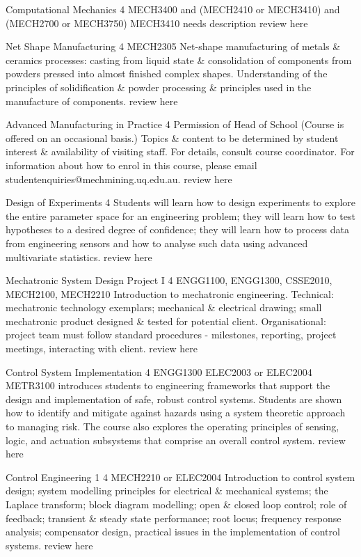 	{Computational Mechanics}
	{4}
	{MECH3400 and (MECH2410 or MECH3410) and (MECH2700 or MECH3750)}
	{}
	{MECH3410}
	{needs description}
	{review here}

	{Net Shape Manufacturing}
	{4}
	{MECH2305}
	{}
	{}
	{Net-shape manufacturing of metals \& ceramics processes: casting from liquid state \& consolidation of components from powders pressed into almost finished complex shapes. Understanding of the principles of solidification \& powder processing \& principles used in the manufacture of components.}
	{review here}

	{Advanced Manufacturing in Practice}
	{4}
	{Permission of Head of School}
	{}
	{}
	{(Course is offered on an occasional basis.) Topics \& content to be determined by student interest \& availability of visiting staff. For details, consult course coordinator. For information about how to enrol in this course, please email studentenquiries@mechmining.uq.edu.au.}
	{review here}

	{Design of Experiments}
	{4}
	{}
	{}
	{}
	{Students will learn how to design experiments to explore the entire parameter space for an engineering problem; they will learn how to test hypotheses to a desired degree of confidence; they will learn how to process data from engineering sensors and how to analyse such data using advanced multivariate statistics.}
	{review here}

	{Mechatronic System Design Project I}
	{4}
	{}
	{ENGG1100, ENGG1300, CSSE2010, MECH2100, MECH2210}
	{}
	{Introduction to mechatronic engineering. Technical: mechatronic technology exemplars; mechanical \& electrical drawing; small mechatronic product designed \& tested for potential client. Organisational: project team must follow standard procedures - milestones, reporting, project meetings, interacting with client.}
	{review here}

	{Control System Implementation}
	{4}
	{ENGG1300}
	{}
	{ELEC2003 or ELEC2004}
	{METR3100 introduces students to engineering frameworks that support the design and implementation of safe, robust control systems. Students are shown how to identify and mitigate against hazards using a system theoretic approach to managing risk. The course also explores the operating principles of sensing, logic, and actuation subsystems that comprise an overall control system.}
	{review here}

	{Control Engineering 1}
	{4}
	{MECH2210 or ELEC2004}
	{}
	{}
	{Introduction to control system design; system modelling principles for electrical \& mechanical systems; the Laplace transform; block diagram modelling; open \& closed loop control; role of feedback; transient \& steady state performance; root locus; frequency response analysis; compensator design, practical issues in the implementation of control systems.}
	{review here}

